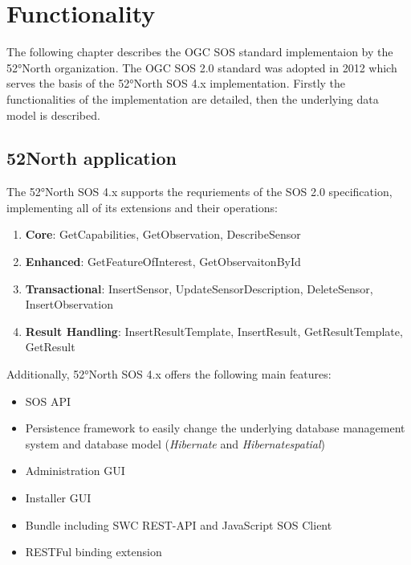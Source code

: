 \chapter{Functionality}
The following chapter describes the OGC SOS standard implementaion by the
52°North organization. The OGC SOS 2.0 standard was adopted in 2012 which
serves the basis of the 52°North SOS 4.x implementation. Firstly the
functionalities of the implementation are detailed, then the underlying data model is described.

\section{52North application}
The 52°North SOS 4.x supports the requriements of the SOS 2.0 specification,
implementing all of its extensions and their operations:
\begin{enumerate}
    \item \textbf{Core}: GetCapabilities, GetObservation, DescribeSensor
    \item \textbf{Enhanced}: GetFeatureOfInterest, GetObservaitonById
    \item \textbf{Transactional}: InsertSensor, UpdateSensorDescription, DeleteSensor,
            InsertObservation
    \item \textbf{Result Handling}: InsertResultTemplate, InsertResult, GetResultTemplate,
            GetResult
\end{enumerate}

Additionally, 52°North SOS 4.x offers the following main features:
\begin{itemize}
    \item SOS API
    \item Persistence framework to easily change the underlying database
    management system and database model (\textit{Hibernate} and
    \textit{Hibernatespatial})
    \item Administration GUI
    \item Installer GUI
    \item Bundle including SWC REST-API and JavaScript SOS Client
    \item RESTFul binding extension
\end{itemize}

